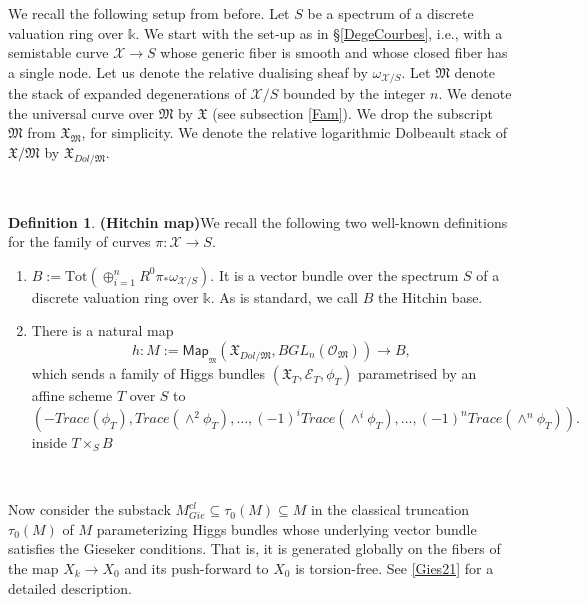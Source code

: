 \documentclass[11pt]{amsart}
\newcommand {\map} {\mathsf{Map}}
\theoremstyle{plain}
\numberwithin{equation}{section}
\theoremstyle{definition}
\newtheorem{Def}{Definition}[section]
\theoremstyle{plain}
\begin{document}
We recall the following setup from before. Let $S$ be a spectrum of a discrete valuation ring over $\mathbb k$. We start with the set-up as in \S \ref{DegeCourbes}, i.e., with a semistable curve $\mathcal{X} \to S$ whose generic fiber is smooth and whose closed fiber has a single node. Let us denote the relative dualising sheaf by $\omega_{\mathcal X/S}$. Let $\mathfrak M$ denote the stack of expanded degenerations of $\mathcal{X}/S$  bounded by the integer $n$. We denote the universal curve over $\mathfrak M$ by $\mathfrak{X}$ (see subsection \ref{Fam}). We drop the subscript $\mathfrak M$ from $\mathfrak X_{\mathfrak M}$, for simplicity. We denote the relative logarithmic Dolbeault stack of $\mathfrak{X}/\mathfrak{M}$  by $\mathfrak X_{Dol/\mathfrak{M}}$.

\

\begin{Def}\textbf{(Hitchin map)}\label{h11}
We recall the following two well-known definitions for the family of curves $\pi: \mathcal X \to S.$
\begin{enumerate}
\item $B:=\mathrm{Tot}(\oplus^n_{i=1} R^0 \pi_* \omega_{\mathcal X/S})$. It is a vector bundle over the spectrum $S$ of a discrete valuation ring over $\mathbb{k}$. As is standard, we call $B$ the Hitchin base. 
\item There is a natural map \[h: M:=\map_{_{\mathfrak M}}(\mathfrak{X}_{Dol/\mathfrak{M}}, BGL_n(\mathcal{O}_{\mathfrak M}))\longrightarrow B,\] which sends a family of Higgs bundles $(\mathfrak X_T, \mathcal E_T, \phi_T)$ parametrised by an affine scheme $T$ over $S$ to \[(- Trace(\phi_T), Trace(\wedge^2 \phi_T),\dots , (-1)^i Trace(\wedge^i\phi_T),\dots,(-1)^n Trace(\wedge^n \phi_T)). \]
inside $T\times_{S} B$
\end{enumerate}
\end{Def}

\

Now consider the substack $M^{cl}_{Gie} \subseteq \tau_0(M) \subseteq M$ in the classical truncation $\tau_0(M)$ of $M$ parameterizing Higgs bundles whose underlying vector bundle satisfies the Gieseker conditions. That is, it is generated globally on the fibers of the map $X_k\to X_0$ and its push-forward to $X_0$ is torsion-free. See \ref{Gies21} for a detailed description. %
\end{document}
